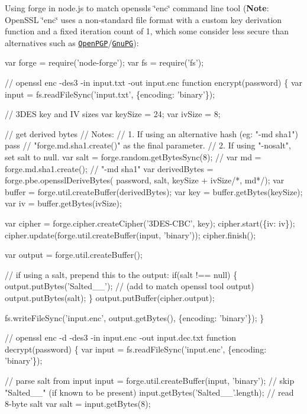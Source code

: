 Using forge in node.\+js to match openssl\textquotesingle{}s \char`\"{}enc\char`\"{} command line tool ({\bfseries Note}\+: Open\+S\+SL \char`\"{}enc\char`\"{} uses a non-\/standard file format with a custom key derivation function and a fixed iteration count of 1, which some consider less secure than alternatives such as \href{https://tools.ietf.org/html/rfc4880}{\tt Open\+P\+GP}/\href{https://www.gnupg.org/}{\tt Gnu\+PG})\+:


\begin{DoxyCode}
var forge = require('node-forge');
var fs = require('fs');

// openssl enc -des3 -in input.txt -out input.enc
function encrypt(password) \{
  var input = fs.readFileSync('input.txt', \{encoding: 'binary'\});

  // 3DES key and IV sizes
  var keySize = 24;
  var ivSize = 8;

  // get derived bytes
  // Notes:
  // 1. If using an alternative hash (eg: "-md sha1") pass
  //   "forge.md.sha1.create()" as the final parameter.
  // 2. If using "-nosalt", set salt to null.
  var salt = forge.random.getBytesSync(8);
  // var md = forge.md.sha1.create(); // "-md sha1"
  var derivedBytes = forge.pbe.opensslDeriveBytes(
    password, salt, keySize + ivSize/*, md*/);
  var buffer = forge.util.createBuffer(derivedBytes);
  var key = buffer.getBytes(keySize);
  var iv = buffer.getBytes(ivSize);

  var cipher = forge.cipher.createCipher('3DES-CBC', key);
  cipher.start(\{iv: iv\});
  cipher.update(forge.util.createBuffer(input, 'binary'));
  cipher.finish();

  var output = forge.util.createBuffer();

  // if using a salt, prepend this to the output:
  if(salt !== null) \{
    output.putBytes('Salted\_\_'); // (add to match openssl tool output)
    output.putBytes(salt);
  \}
  output.putBuffer(cipher.output);

  fs.writeFileSync('input.enc', output.getBytes(), \{encoding: 'binary'\});
\}

// openssl enc -d -des3 -in input.enc -out input.dec.txt
function decrypt(password) \{
  var input = fs.readFileSync('input.enc', \{encoding: 'binary'\});

  // parse salt from input
  input = forge.util.createBuffer(input, 'binary');
  // skip "Salted\_\_" (if known to be present)
  input.getBytes('Salted\_\_'.length);
  // read 8-byte salt
  var salt = input.getBytes(8);


\end{DoxyCode}
